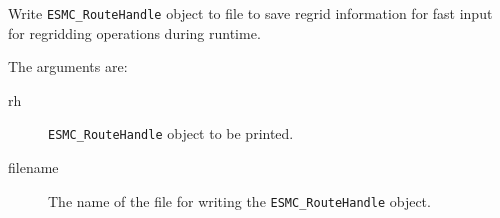   
    Write {\tt ESMC\_RouteHandle} object to file to save regrid information for
    fast input for regridding operations during runtime.
  
    The arguments are:
    \begin{description}
    \item[rh] 
      {\tt ESMC\_RouteHandle} object to be printed.
    \item[filename] 
      The name of the file for writing the {\tt ESMC\_RouteHandle} object.
    \end{description}
  
\setlength{\parskip}{\oldparskip}
\setlength{\parindent}{\oldparindent}
\setlength{\baselineskip}{\oldbaselineskip}
